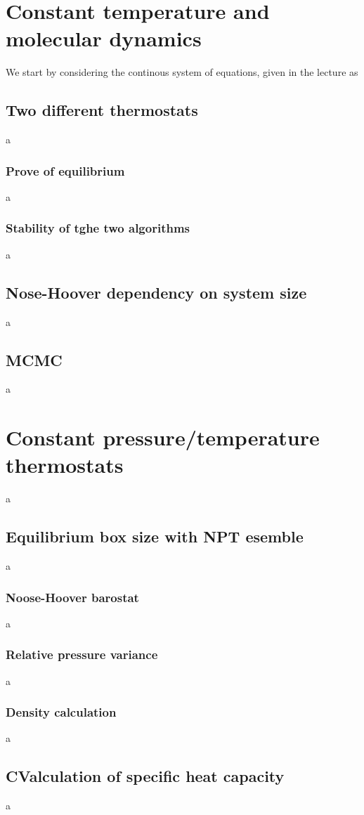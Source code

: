 \documentclass[10pt,a4paper]{report}
\begin{document}
\section{Constant temperature and molecular dynamics}
We start by considering the continous system of equations, given in the lecture as


\subsection{Two different thermostats}
a
\subsubsection{Prove of equilibrium}
a
\subsubsection{Stability of tghe two algorithms}
a
\subsection{Nose-Hoover dependency on system size}
a
\subsection{MCMC}
a


\section{Constant pressure/temperature thermostats}
a
\subsection{Equilibrium box size with NPT esemble}
a
\subsubsection{Noose-Hoover barostat}
a
\subsubsection{Relative pressure variance}
a
\subsubsection{Density calculation}
a
\subsection{CValculation of specific heat capacity}
a
\end{document}
